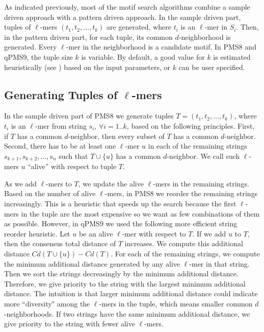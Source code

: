 As indicated previously, most of the motif search algorithms combine a sample
driven approach with a pattern driven approach. In the sample driven part, tuples of $\ell$-mers $(t_1,
t_2, \ldots, t_k)$ are generated, where $t_i$ is an $\ell$-mer in $S_i$. Then,
in the pattern driven part, for each tuple, its common $d$-neighborhood is
generated. Every $\ell$-mer in the neighborhood is  a candidate motif. In
PMS8 and qPMS9, the tuple size $k$ is variable.
By default, a good value for $k$ is estimated heuristically (see
\cite{NRPMS14}) based on the input parameters, or $k$ can be user specified.

\subsection{Generating Tuples of $\ell$-mers}

In the sample driven part of PMS8 we generate tuples $T=(t_1, t_2,
\ldots, t_k)$, where $t_i$ is an $\ell$-mer from string $s_i$, $\forall i=1..k$, based
on the following principles.
First, if $T$ has a common $d$-neighbor, then every subset of $T$ has a
common $d$-neighbor.
Second, there has to be at least one $\ell$-mer $u$ in
each of the remaining strings $s_{k+1}, s_{k+2}, \ldots, s_n$ such that $T \cup
\{u\}$ has a common $d$-neighbor. We call such $\ell$-mers $u$
``alive'' with respect to tuple $T$.


As we add $\ell$-mers to $T$, we update the alive $\ell$-mers in the remaining
strings. Based on the  number of alive $\ell$-mers, in PMS8 we reorder the
remaining strings increasingly. This is a heuristic that speeds up the search
because the first $\ell$-mers in the tuple are the most expensive so
we want as few combinations of them as possible. However, in qPMS9 we used the
following more efficient string reorder heuristic. Let $u$ be an alive $\ell$-mer with respect to $T$. If we add $u$ to $T$, then the consensus total distance of $T$ increases.
We compute this additional distance $Cd(T\cup\{u\})-Cd(T)$. For each of the remaining strings,
we compute the minimum additional distance generated by any alive
$\ell$-mer in that string. Then we sort the strings decreasingly by the minimum additional
distance.
Therefore, we give priority to the string with the largest minimum additional
distance. 
The intuition is that larger minimum additional distance could indicate more
``diversity" among the $\ell$-mers in the tuple, which means smaller common
$d$-neighborhoods. 
If two strings have the same minimum additional distance, we give
priority to the string with fewer alive $\ell$-mers.

